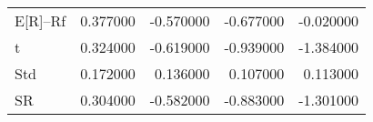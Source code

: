 \begin{tabular}{lrrrr}
\toprule
\midrule
E[R]--Rf & 0.377000 & -0.570000 & -0.677000 & -0.020000 \\
t & 0.324000 & -0.619000 & -0.939000 & -1.384000 \\
Std & 0.172000 & 0.136000 & 0.107000 & 0.113000 \\
SR & 0.304000 & -0.582000 & -0.883000 & -1.301000 \\
\bottomrule
\end{tabular}
